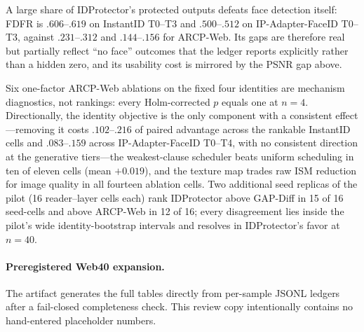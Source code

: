 {A large share of IDProtector's protected outputs defeats face detection
itself: FDFR is $.606$--$.619$ on InstantID T0--T3 and $.500$--$.512$ on
IP-Adapter-FaceID T0--T3, against $.231$--$.312$ and $.144$--$.156$ for
ARCP-Web. Its gaps are therefore real but partially reflect ``no face''
outcomes that the ledger reports explicitly rather than a hidden zero, and
its usability cost is mirrored by the PSNR gap above.

Six one-factor ARCP-Web ablations on the fixed four identities are mechanism
diagnostics, not rankings: every Holm-corrected $p$ equals one at $n=4$.
Directionally, the identity objective is the only component with a consistent
effect---removing it costs $.102$--$.216$ of paired advantage across the
rankable InstantID cells and $.083$--$.159$ across IP-Adapter-FaceID T0--T4,
with no consistent direction at the generative tiers---the weakest-clause
scheduler beats uniform scheduling in ten of eleven cells (mean $+0.019$),
and the texture map trades raw ISM reduction for image quality in all
fourteen ablation cells. Two additional seed replicas of the pilot (16
reader--layer cells each) rank IDProtector above GAP-Diff in 15 of 16
seed-cells and above ARCP-Web in 12 of 16; every disagreement lies inside the
pilot's wide identity-bootstrap intervals and resolves in IDProtector's favor
at $n=40$.
}{%
\paragraph{Preregistered Web40 expansion.} The artifact generates the full
tables directly from per-sample JSONL ledgers after a fail-closed completeness
check. This review copy intentionally contains no hand-entered placeholder
numbers.
}
